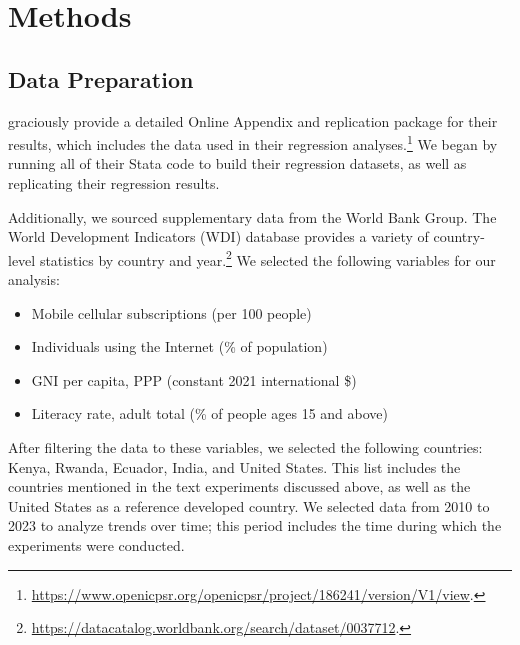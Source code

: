 \documentclass[12pt]{article}
\begin{document}
\section{Methods}
\label{section:methods}

\subsection{Data Preparation}
\textcite{fabregas_digital_2025} graciously provide a detailed Online Appendix and replication package for their results, which includes the data used in their regression analyses.\footnote{\url{https://www.openicpsr.org/openicpsr/project/186241/version/V1/view}.} We began by running all of their Stata code to build their regression datasets, as well as replicating their regression results.

Additionally, we sourced supplementary data from the World Bank Group. The World Development Indicators (WDI) database provides a variety of country-level statistics by country and year.\footnote{\url{https://datacatalog.worldbank.org/search/dataset/0037712}.} We selected the following variables for our analysis:
\begin{itemize}
    \singlespacing
    \item Mobile cellular subscriptions (per 100 people)
    \item Individuals using the Internet (\% of population)
    \item GNI per capita, PPP (constant 2021 international \$)
    \item Literacy rate, adult total (\% of people ages 15 and above)
\end{itemize}
After filtering the data to these variables, we selected the following countries: Kenya, Rwanda, Ecuador, India, and United States. This list includes the countries mentioned in the text experiments discussed above, as well as the United States as a reference developed country. We selected data from 2010 to 2023 to analyze trends over time; this period includes the time during which the \textcite{fabregas_digital_2025} experiments were conducted.
\end{document}
